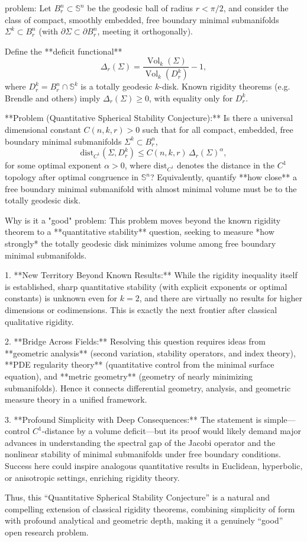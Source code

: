 problem:  
Let \(B_r^n \subset \mathbb{S}^n\) be the geodesic ball of radius \(r < \pi/2\), and consider the class of compact, smoothly embedded, free boundary minimal submanifolds \(\Sigma^k \subset B_r^n\) (with \(\partial \Sigma \subset \partial B_r^n\), meeting it orthogonally).  

Define the **deficit functional**  
\[
\Delta_r(\Sigma) = \frac{\operatorname{Vol}_k(\Sigma)}{\operatorname{Vol}_k(D_r^k)} - 1 ,
\]
where \(D_r^k = B_r^n \cap \mathbb{S}^k\) is a totally geodesic \(k\)-disk.  
Known rigidity theorems (e.g. Brendle and others) imply \(\Delta_r(\Sigma) \ge 0\), with equality only for \(D_r^k\).

**Problem (Quantitative Spherical Stability Conjecture):**  
Is there a universal dimensional constant \(C(n,k,r)>0\) such that for all compact, embedded, free boundary minimal submanifolds \(\Sigma^k \subset B_r^n\),
\[
\mathrm{dist}_{C^1}(\Sigma, D_r^k) \le C(n,k,r) \, \Delta_r(\Sigma)^{\alpha},
\]
for some optimal exponent \(\alpha > 0\), where \(\mathrm{dist}_{C^1}\) denotes the distance in the \(C^1\) topology after optimal congruence in \(\mathbb{S}^n\)?  
Equivalently, quantify **how close** a free boundary minimal submanifold with almost minimal volume must be to the totally geodesic disk.

Why is it a "good" problem:  
This problem moves beyond the known rigidity theorem to a **quantitative stability** question, seeking to measure *how strongly* the totally geodesic disk minimizes volume among free boundary minimal submanifolds.  

1. **New Territory Beyond Known Results:**  
   While the rigidity inequality itself is established, sharp quantitative stability (with explicit exponents or optimal constants) is unknown even for \(k=2\), and there are virtually no results for higher dimensions or codimensions. This is exactly the next frontier after classical qualitative rigidity.

2. **Bridge Across Fields:**  
   Resolving this question requires ideas from **geometric analysis** (second variation, stability operators, and index theory), **PDE regularity theory** (quantitative control from the minimal surface equation), and **metric geometry** (geometry of nearly minimizing submanifolds). Hence it connects differential geometry, analysis, and geometric measure theory in a unified framework.

3. **Profound Simplicity with Deep Consequences:**  
   The statement is simple—control \(C^1\)-distance by a volume deficit—but its proof would likely demand major advances in understanding the spectral gap of the Jacobi operator and the nonlinear stability of minimal submanifolds under free boundary conditions.  
   Success here could inspire analogous quantitative results in Euclidean, hyperbolic, or anisotropic settings, enriching rigidity theory.

Thus, this “Quantitative Spherical Stability Conjecture” is a natural and compelling extension of classical rigidity theorems, combining simplicity of form with profound analytical and geometric depth, making it a genuinely “good” open research problem.